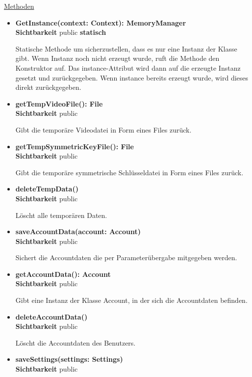 \underline{Methoden}
\begin{itemize}
\itemsep0pt

\item \textbf{GetInstance(context: Context): MemoryManager}\hfill\\
\textbf{Sichtbarkeit} public \newline
\textbf{statisch} 

Statische Methode um sicherzustellen, dass es nur eine Instanz der Klasse gibt. Wenn Instanz noch nicht erzeugt wurde, ruft die Methode den Konstruktor auf. Das instance-Attribut wird dann auf die erzeugte Instanz gesetzt und zurückgegeben. Wenn instance bereits erzeugt wurde, wird dieses direkt zurückgegeben.

\item \textbf{getTempVideoFile(): File}\hfill\\
\textbf{Sichtbarkeit} public

Gibt die temporäre Videodatei in Form eines Files zurück.

\item \textbf{getTempSymmetricKeyFile(): File}\hfill\\
\textbf{Sichtbarkeit} public

Gibt die temporäre symmetrische Schlüsseldatei in Form eines Files zurück.

\item \textbf{deleteTempData()}\hfill\\
\textbf{Sichtbarkeit} public

Löscht alle temporären Daten.

\item \textbf{saveAccountData(account: Account)}\hfill\\
\textbf{Sichtbarkeit} public

Sichert die Accountdaten die per Parameterübergabe mitgegeben werden.

\item \textbf{getAccountData(): Account}\hfill\\
\textbf{Sichtbarkeit} public

Gibt eine Instanz der Klasse Account, in der sich die Accountdaten befinden.

\item \textbf{deleteAccountData()}\hfill\\
\textbf{Sichtbarkeit} public

Löscht die Accountdaten des Benutzers.

\item \textbf{saveSettings(settings: Settings)}\hfill\\
\textbf{Sichtbarkeit} public


\end{itemize}
